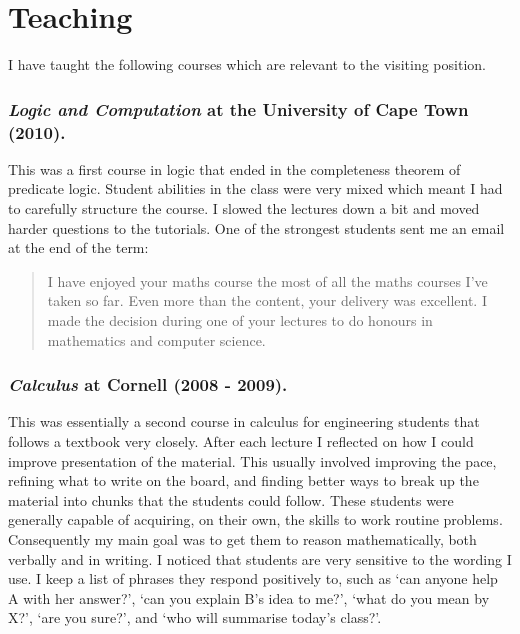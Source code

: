 \documentclass{article}[12pt]
\theoremstyle{plain} \numberwithin{equation}{section}
\theoremstyle{definition}
\begin{document}
\thispagestyle{fancy}

\section*{Teaching}
I have taught the following courses which are relevant to the visiting position.

\subsubsection*{{\em Logic and Computation} at the University of Cape Town (2010).}

This was a first course in logic that ended in the completeness theorem of predicate logic.
Student abilities in the class were very mixed which meant I had to carefully structure the course. I slowed the lectures down a bit and moved harder questions to the tutorials. One of the strongest students sent me an email at the end of the term:
\begin{quote}
I have enjoyed your maths course the most of all the maths courses I've taken so far. Even more than the content, your delivery was excellent.
I made the decision during one of your lectures to do honours in mathematics and computer science. 
\end{quote}

\subsubsection*{{\em Calculus} at Cornell (2008 - 2009).}
This was essentially a second course in calculus for engineering students that follows a textbook very closely.
After each lecture I reflected on how I could improve presentation of the material. This usually involved improving the pace, refining what to write on the board, and finding better ways to break up the material into chunks that the students could follow. These students were generally capable of acquiring, on their own, the skills to work routine problems.
Consequently my main goal  was to get them to reason mathematically, both verbally and in writing. 
I noticed that students are very sensitive to the wording I use.
I keep a list of phrases they respond positively to, such as  `can anyone help A with her answer?', `can you explain B's idea to me?', `what do you mean by X?',
`are you sure?',  and `who will summarise today's class?'.
\end{document}
